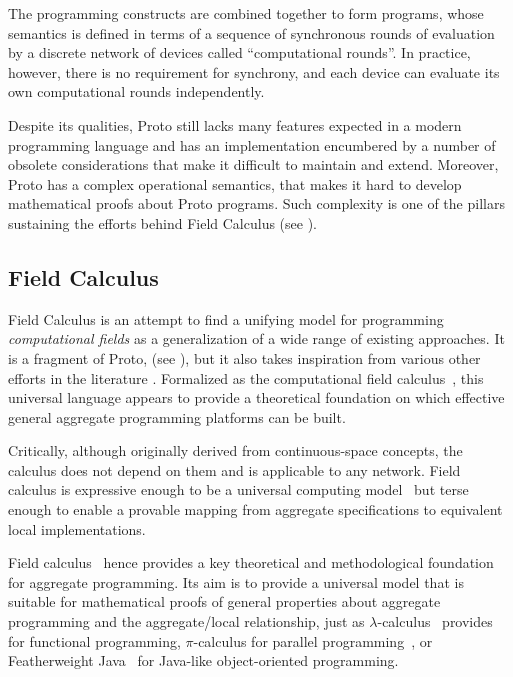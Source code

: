 \documentclass[12pt,a4paper,twoside,openright]{book}
\begin{document}
The programming constructs are combined together to form programs, whose semantics is defined in terms of a sequence of synchronous rounds of evaluation by a discrete network of devices called ``computational rounds''.
%
In practice, however, there is no requirement for synchrony, and each device can evaluate its own computational rounds independently.

Despite its qualities, Proto still lacks many features expected in a modern programming language and has an implementation encumbered by a number of obsolete considerations that make it difficult to maintain and extend.
%
Moreover, Proto has a complex operational semantics, that makes it hard to develop mathematical proofs about Proto programs.
%
Such complexity is one of the pillars sustaining the efforts behind Field Calculus (see ).

\subsection{Field Calculus}
\label{field-calculus}

Field Calculus is an attempt to find a unifying model for programming \emph{computational fields} as a generalization of a wide range of existing approaches.
%
It is a fragment of Proto, (see ), but it also takes inspiration from various other efforts in the literature \cite{mamei2009acm,regiment,VCMZ-TAAS2011,tota2,nagpalphd,yamins,regiment}.
%
Formalized as the computational field calculus~\cite{VDB-FOCLASA-CIC2013}, this universal language appears to provide a theoretical foundation on which effective general aggregate programming platforms can be built.

Critically, although originally derived from continuous-space concepts, the calculus does not depend on them and is applicable to any network.
%
Field calculus is expressive enough to be a universal computing model~\cite{BVD-SCW14} but terse enough to enable a provable mapping from aggregate specifications to equivalent local implementations.

Field calculus~\cite{VDB-FOCLASA-CIC2013} hence provides a key theoretical and methodological foundation for aggregate programming.
%
Its aim is to provide a universal model that is suitable for mathematical proofs of general properties about aggregate programming and the aggregate/local relationship, just as $\lambda$-calculus~\cite{LambdaCalculus} provides for functional programming, $\pi$-calculus for parallel programming~\cite{PiCalculus}, or Featherweight Java~\cite{FJ} for Java-like object-oriented programming.
\end{document}
